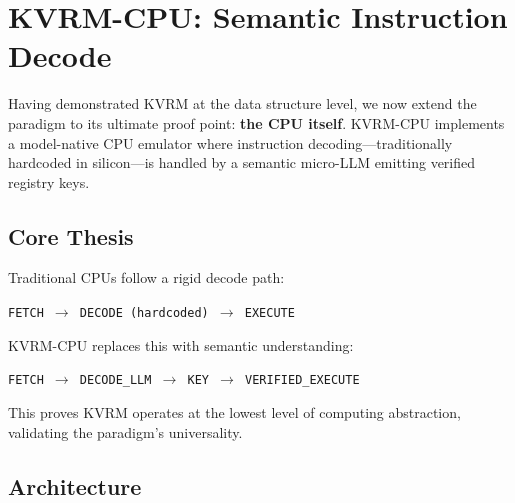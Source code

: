 \documentclass[11pt,a4paper]{article}
\begin{document}
\section{KVRM-CPU: Semantic Instruction Decode}
\label{sec:kvrm-cpu}

Having demonstrated KVRM at the data structure level, we now extend the paradigm to its ultimate proof point: \textbf{the CPU itself}. KVRM-CPU implements a model-native CPU emulator where instruction decoding---traditionally hardcoded in silicon---is handled by a semantic micro-LLM emitting verified registry keys.

\subsection{Core Thesis}

Traditional CPUs follow a rigid decode path:
\begin{center}
\texttt{FETCH $\to$ DECODE (hardcoded) $\to$ EXECUTE}
\end{center}

KVRM-CPU replaces this with semantic understanding:
\begin{center}
\texttt{FETCH $\to$ DECODE\_LLM $\to$ KEY $\to$ VERIFIED\_EXECUTE}
\end{center}

This proves KVRM operates at the lowest level of computing abstraction, validating the paradigm's universality.

\subsection{Architecture}

\end{document}

